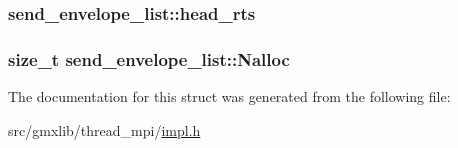 \hypertarget{structsend__envelope__list_acf27274dc94ca36d5d8df6f9a2168ed2}{
\subsubsection[{head\-\_\-rts}]{ {\bf send\-\_\-envelope\-\_\-list\-::head\-\_\-rts}}}\label{structsend__envelope__list_acf27274dc94ca36d5d8df6f9a2168ed2}
\hypertarget{structsend__envelope__list_aa51c596956a6dee67805624197c00743}{
\subsubsection[{\-Nalloc}]{\setlength{\rightskip}{0pt plus 5cm}size\-\_\-t {\bf send\-\_\-envelope\-\_\-list\-::\-Nalloc}}}\label{structsend__envelope__list_aa51c596956a6dee67805624197c00743}


\-The documentation for this struct was generated from the following file\-:\begin{DoxyCompactItemize}
\item 
src/gmxlib/thread\-\_\-mpi/\hyperlink{impl_8h}{impl.\-h}\end{DoxyCompactItemize}
